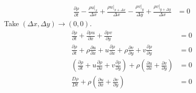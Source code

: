 \documentclass[twoside]{article}
\numberwithin{equation}{section}
\begin{document}
{\begin{align*}
			 \frac{\partial \rho}{\partial t}-\frac{\rho u \big|_x}{\Delta x}+\frac{\rho u \big|_{x+\Delta x}}{\Delta x}-\frac{\rho v \big|_y}{\Delta y}+\frac{\rho v \big|_{y+\Delta y}}{\Delta x} &= 0
		\end{align*}
		Take $(\Delta x, \Delta y) \to (0, 0)$.
		\begin{align*}
			\frac{\partial \rho}{\partial t}+\frac{\partial \rho u}{\partial x}+\frac{\partial \rho v}{\partial y} &= 0 \\
			\frac{\partial \rho}{\partial t}+\rho \frac{\partial u}{\partial x}+u \frac{\partial \rho}{\partial x}+\rho \frac{\partial v}{\partial y}+v \frac{\partial \rho}{\partial y} &= 0 \\
			\left( \frac{\partial \rho}{\partial t}+u \frac{\partial \rho}{\partial x}+v \frac{\partial \rho}{\partial y} \right)+\rho \left( \frac{\partial u}{\partial x}+\frac{\partial v}{\partial y} \right) &= 0 \\
			\frac{D\rho}{Dt}+\rho \left( \frac{\partial u}{\partial x}+\frac{\partial v}{\partial y} \right) &= 0
		\end{align*}
	}
	
	\newpage
	
\end{document}
